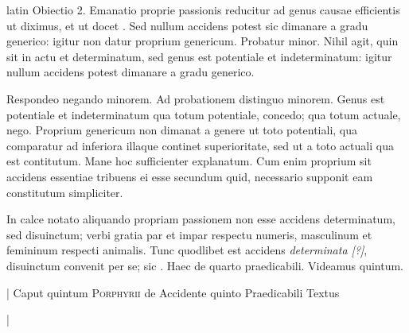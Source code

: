 \begin{otherlanguage*}{latin}
\pstart
  Obiectio 2. Emanatio proprie passionis reducitur ad genus causae efficientis ut diximus, et ut docet . Sed nullum accidens potest sic dimanare a gradu generico: igitur non datur proprium genericum. Probatur minor. Nihil agit, quin sit in actu et determinatum, sed genus est potentiale et indeterminatum: igitur nullum accidens potest dimanare a gradu generico. 
\pend

\pstart
  Respondeo negando minorem. Ad probationem distinguo minorem. Genus est potentiale et indeterminatum qua totum potentiale, concedo; qua totum actuale, nego. Proprium genericum non dimanat a genere ut toto potentiali, qua comparatur ad inferiora illaque continet superioritate, sed ut a toto actuali qua est contitutum. Mane hoc sufficienter explanatum. Cum enim proprium sit accidens essentiae tribuens ei esse secundum quid, necessario supponit eam constitutum simpliciter. 
\pend

\pstart
  In calce notato aliquando propriam passionem non esse accidens determinatum, sed disuinctum; verbi gratia par et impar respectu numeris, masculinum et femininum respecti animalis. Tunc quodlibet est accidens \emph{determinata [?]}, disuinctum convenit per se; sic . Haec de quarto praedicabili. Videamus quintum. 
\pend

        \pstart
        \pend
      
        \pstart
        \pend
      
\pstart
\noindent%
 \textnormal{|}   Caput quintum \textsc{Porphyrii} de Accidente quinto Praedicabili Textus 
\pend

\pstart
 \textnormal{|}  
\pend


\end{otherlanguage*}
